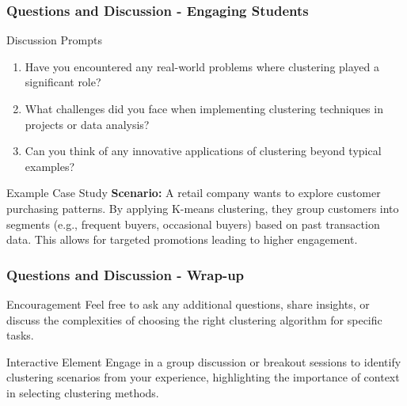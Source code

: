\documentclass[aspectratio=169]{beamer}
\begin{document}
\begin{frame}[fragile]
    \frametitle{Questions and Discussion - Engaging Students}
    \begin{block}{Discussion Prompts}
        \begin{enumerate}
            \item Have you encountered any real-world problems where clustering played a significant role? 
            \item What challenges did you face when implementing clustering techniques in projects or data analysis?
            \item Can you think of any innovative applications of clustering beyond typical examples?
        \end{enumerate}
    \end{block}
    
    \begin{block}{Example Case Study}
        \textbf{Scenario:} A retail company wants to explore customer purchasing patterns. By applying K-means clustering, they group customers into segments (e.g., frequent buyers, occasional buyers) based on past transaction data. This allows for targeted promotions leading to higher engagement.
    \end{block}
\end{frame}

\begin{frame}[fragile]
    \frametitle{Questions and Discussion - Wrap-up}
    \begin{block}{Encouragement}
        Feel free to ask any additional questions, share insights, or discuss the complexities of choosing the right clustering algorithm for specific tasks.
    \end{block}
    
    \begin{block}{Interactive Element}
        Engage in a group discussion or breakout sessions to identify clustering scenarios from your experience, highlighting the importance of context in selecting clustering methods.
    \end{block}
\end{frame}
\end{document}
